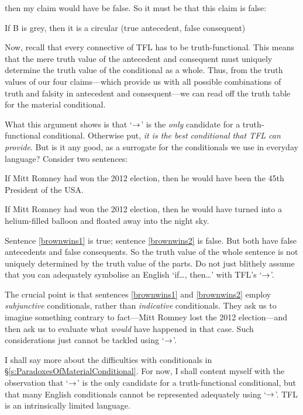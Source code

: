 then my claim would have be false. So it must be that this claim is false:
	\begin{ebullet}
		\item If B is grey, then it is a circular \hfill (true antecedent, false consequent)
	\end{ebullet}
Now, recall that every connective of TFL has to be truth-functional. This means that the mere truth value of the antecedent and consequent must uniquely determine the truth value of the conditional as a whole. Thus, from the truth values of our four claims---which provide us with all possible combinations of truth and falsity in antecedent and consequent---we can read off the truth table for the material conditional.

What this argument shows is that `$\rightarrow$' is the \emph{only} candidate for a truth-functional conditional. Otherwise put, \emph{it is the best conditional that TFL can provide}. But is it any good, as a surrogate for the conditionals we use in everyday language? Consider two sentences:
	\begin{earg}
		\item[\ex{brownwins1}] If Mitt Romney had won the 2012 election, then he would have been the 45th President of the USA.
		\item[\ex{brownwins2}] If Mitt Romney had won the 2012 election, then he would have turned into a helium-filled balloon and floated away into the night sky.
	\end{earg}
Sentence \ref{brownwins1} is true; sentence \ref{brownwins2} is false. But both have false antecedents and false consequents. So the truth value of the whole sentence is not uniquely determined by the truth value of the parts. Do not just blithely assume that you can adequately symbolise an English `if\ldots, then\ldots' with TFL's `$\rightarrow$'. 

The crucial point is that sentences \ref{brownwins1} and \ref{brownwins2} employ \emph{subjunctive} conditionals, rather than \emph{indicative} conditionals. They ask us to imagine something contrary to fact---Mitt Romney lost the 2012 election---and then ask us to evaluate what \emph{would} have happened in that case. Such considerations just cannot be tackled using `$\rightarrow$'.

I shall say more about the difficulties with conditionals in \S\ref{s:ParadoxesOfMaterialConditional}. For now, I shall content myself with the observation that `$\rightarrow$' is the only candidate for a truth-functional conditional, but that many English conditionals cannot be represented adequately using `$\rightarrow$'. TFL is an intrinsically limited language. 


